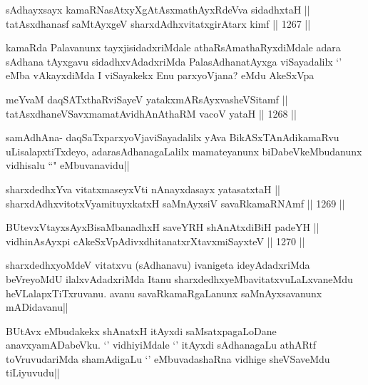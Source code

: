
\begin{shl}
sAdhayxsayx kamaRNasAtxyXgAtAsxmathAyxRdeVva sidadhxtaH || \\
tatAsxdhanasf saMtAyxgeV sharxdAdhxvitatxgirA\s tarx kimf ||  1267 || 
\end{shl}

\begin{artha}
kamaRda Palavanunx tayxjisidadxriMdale athaRsAmathaRyxdiMdale adara sAdhana tAyxgavu sidadhxvAdadxriMda PalasAdhanatAyxga viSayadalilx `\stext' eMba vAkayxdiMda I viSayakekx Enu parxyoVjana? eMdu AkeSxVpa
\end{artha}

\begin{shl}
meYvaM daqSATxthaRviSayeV yatakxmARsAyxvasheVSitamf || \\
tatAsxdhaneVSavxmamatAvidhAnAthaRM vacoV yataH ||  1268 ||  
\end{shl}

\begin{artha}
samAdhAna- daqSaTxparxyoVjaviSayadalilx yAva BikASxTAnAdikamaRvu uLisalapxtiTxdeyo, adarasAdhanagaLalilx mamateyanunx biDabeVkeMbudanunx vidhisalu ``\stext" eMbuvanavidu||
\end{artha}

\begin{shl}
sharxdedhxYva vitatxmaseyxVti nAnayxdasayx yatasatxtaH || \\
sharxdAdhxvitotxV\s yamituyxkatxH saMnAyxsiV savaRkamaRNAmf ||  1269 ||  
\end{shl}
				
\begin{shl}
BUtevxVtayxsAyxBisaMbanadhxH saveYRH shAnAtxdiBiH padeYH || \\
vidhinA\s sAyxpi cA\s \s keSxVpAdivxdhitanatxrXtavxmiSayxteV ||  1270 ||  
\end{shl}

\begin{artha}
sharxdedhxyoMdeV vitatxvu (sAdhanavu) ivanigeta ideyAdadxriMda beVreyoMdU ilalxvAdadxriMda Itanu sharxdedhxyeMbavitatxvuLaLxvaneMdu heVLalapxTiTxruvanu. avanu savaRkamaRgaLanunx saMnAyxsavanunx mADidavanu||
\end{artha}

\begin{artha}
BUtAvx eMbudakekx shAnatxH itAyxdi saMsatxpagaLoDane anavxyamADabeVku. `\stext' vidhiyiMdale `\stext' itAyxdi sAdhanagaLu athARtf toVruvudariMda shamAdigaLu `\stext' eMbuvadashaRna vidhige sheVSaveMdu tiLiyuvudu||
\end{artha}

